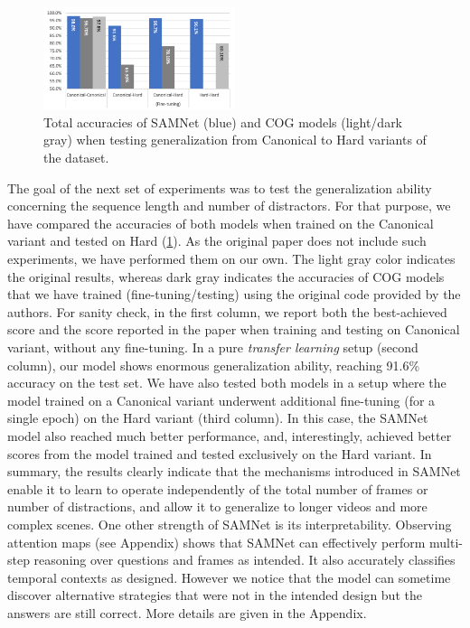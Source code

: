 \begin{figure}
	\centering
	\includegraphics[width=0.5\textwidth]{../results/samnet_cog_overall_transfer.png}
	\caption{Total accuracies of SAMNet (blue) and COG models (light/dark gray) when testing generalization from Canonical to Hard variants of the dataset.}
	\label{fig:samnet_cog_overall_transfer}
\end{figure}

The goal of the next set of experiments was to test the generalization ability concerning the sequence length and number of distractors.
For that purpose, we have compared the accuracies of both models when trained on the Canonical variant and tested on Hard (\cref{fig:samnet_cog_overall_transfer}).
As the original paper does not include such experiments, we have performed them on our own.  The light gray color indicates the original results, whereas dark gray indicates the accuracies of COG models that we have trained (fine-tuning/testing) using the original code provided by the authors.
For sanity check, in the first column, we report both the best-achieved score and the score reported in the paper when training and testing on Canonical variant, without any fine-tuning.
In a pure \textit{transfer learning} setup (second column), our model shows enormous generalization ability, reaching 91.6\% accuracy on the test set.
We have also tested both models in a setup where the model trained on a Canonical variant underwent additional fine-tuning (for a single epoch) on the Hard variant (third column).
In this case, the SAMNet model also reached much better performance, and, interestingly, achieved better scores from the model trained and tested exclusively on the Hard variant.
In summary, the results clearly indicate that the mechanisms introduced in SAMNet  enable it to learn to operate independently of the total number of frames or number of distractions, and allow it to generalize to longer videos and more complex scenes. One other strength of SAMNet is its interpretability. Observing attention maps (see Appendix) shows that SAMNet can effectively perform multi-step reasoning over questions and frames as intended. It also accurately classifies temporal contexts as designed. However we notice that the model can sometime discover alternative strategies that were not in the intended design but the answers are still correct. More details are given in the Appendix.


